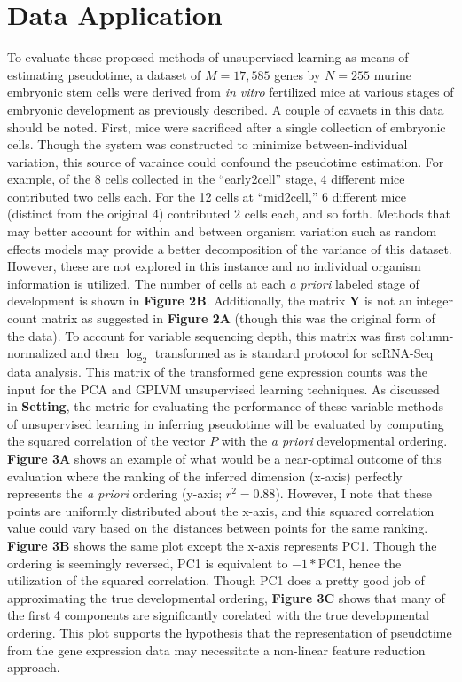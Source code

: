 \documentclass[english, 11pt]{article}\usepackage[]{graphicx}\usepackage[]{color}
\begin{document}
\section{Data Application}
To evaluate these proposed methods of unsupervised learning as means of estimating pseudotime, a dataset of $M = 17,585$ genes by $N = 255$ murine embryonic stem cells were derived from \textit{in vitro} fertilized mice at various stages of embryonic development as previously described.  \cite{deng2014single} A couple of cavaets in this data should be noted. First, mice were sacrificed after a single collection of embryonic cells. Though the system was constructed to minimize between-individual variation, this source of varaince could confound the pseudotime estimation. For example, of the 8 cells collected in the ``early2cell'' stage, 4 different mice contributed two cells each. For the 12 cells at ``mid2cell,'' 6 different mice (distinct from the original 4) contributed 2 cells each, and so forth. Methods that may better account for within and between organism variation such as random effects models may provide a better decomposition of the variance of this dataset. However, these are not explored in this instance and no individual organism information is utilized. The number of cells at each \textit{a priori} labeled stage of development is shown in \textbf{Figure 2B}. Additionally, the matrix $\mathbf{Y}$ is not an integer count matrix as suggested in \textbf{Figure 2A} (though this was the original form of the data). To account for variable sequencing depth, this matrix was first column-normalized and then $\log_2$ transformed as is standard protocol for scRNA-Seq data analysis. This matrix of the transformed gene expression counts was the input for the PCA and GPLVM unsupervised learning techniques. \newline \newline
As discussed in \textbf{Setting}, the metric for evaluating the performance of these variable methods of unsupervised learning in inferring pseudotime will be evaluated by computing the squared correlation of the vector $P$ with the \textit{a priori} developmental ordering. \textbf{Figure 3A} shows an example of what would be a near-optimal outcome of this evaluation where the ranking of the inferred dimension (x-axis) perfectly represents the \textit{a priori} ordering (y-axis; $r^2 = 0.88$). However, I note that these points are uniformly distributed about the x-axis, and this squared correlation value could vary based on the distances between points for the same ranking. \textbf{Figure 3B} shows the same plot except the x-axis represents PC1. Though the ordering is seemingly reversed, PC1 is equivalent to $-1*$PC1, hence the utilization of the squared correlation. Though PC1 does a pretty good job of approximating the true developmental ordering, \textbf{Figure 3C} shows that many of the first 4 components are significantly corelated with the true developmental ordering. This plot supports the hypothesis that the representation of pseudotime from the gene expression data may necessitate a non-linear feature reduction approach. \newline \newline
\end{document}
